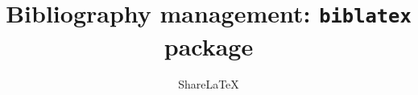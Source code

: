 %
%
%
% 
%
%

\documentclass[12pt]{article}
\usepackage[english]{babel}
\usepackage[utf8]{inputenc}
\usepackage{amsmath}
\usepackage{graphicx}
\usepackage[colorinlistoftodos]{todonotes}
\usepackage{pdfpages}
\usepackage[
backend=biber,
style=numeric,
sorting=none
]{biblatex}


\title{Bibliography management: \texttt{biblatex} package}
\author{Share\LaTeX}
\date{ }




